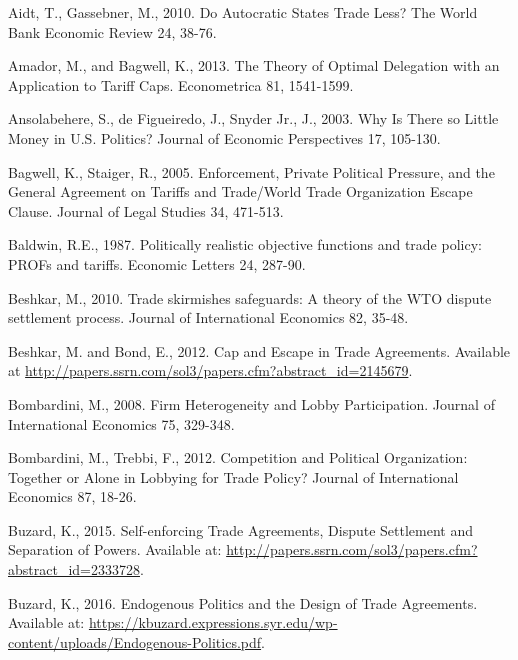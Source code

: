 \documentclass[10pt]{article}
\begin{document}
\begin{list}{}{\setlength{\leftmargin}{0.0in}\setlength{\rightmargin}{0.0in}\setlength{\itemindent}{0.0in}\setlength{\itemsep}{0.1in}}


\item Aidt, T., Gassebner, M., 2010. Do Autocratic States Trade Less? The World Bank Economic Review 24, 38-76.

\item Amador, M., and Bagwell, K., 2013. The Theory of Optimal Delegation with an Application to Tariff Caps. Econometrica 81, 1541-1599.

\item Ansolabehere, S., de Figueiredo, J., Snyder Jr., J., 2003. Why Is There so Little Money in U.S. Politics? Journal of Economic Perspectives 17, 105-130.

\item Bagwell, K., Staiger, R., 2005. Enforcement, Private Political Pressure, and the General Agreement on Tariffs and Trade/World Trade Organization Escape Clause. Journal of Legal Studies 34, 471-513. 

\item Baldwin, R.E., 1987. Politically realistic objective functions and trade policy: PROFs and tariffs. Economic Letters 24, 287-90.

\item Beshkar, M., 2010. Trade skirmishes safeguards: A theory of the WTO dispute settlement process. Journal of International Economics 82, 35-48.

\item Beshkar, M. and Bond, E., 2012. Cap and Escape in Trade Agreements. Available at \url{http://papers.ssrn.com/sol3/papers.cfm?abstract_id=2145679}.

\item Bombardini, M., 2008. Firm Heterogeneity and Lobby Participation. Journal of International Economics 75, 329-348.

\item Bombardini, M., Trebbi, F., 2012. Competition and Political Organization: Together or Alone in Lobbying for Trade Policy? Journal of International Economics 87, 18-26.

\item Buzard, K., 2015. Self-enforcing Trade Agreements, Dispute Settlement and Separation of Powers. Available at: \url{http://papers.ssrn.com/sol3/papers.cfm?abstract_id=2333728}.

\item Buzard, K., 2016. Endogenous Politics and the Design of Trade Agreements. Available at: \url{https://kbuzard.expressions.syr.edu/wp-content/uploads/Endogenous-Politics.pdf}.


\end{list}
\end{document}
